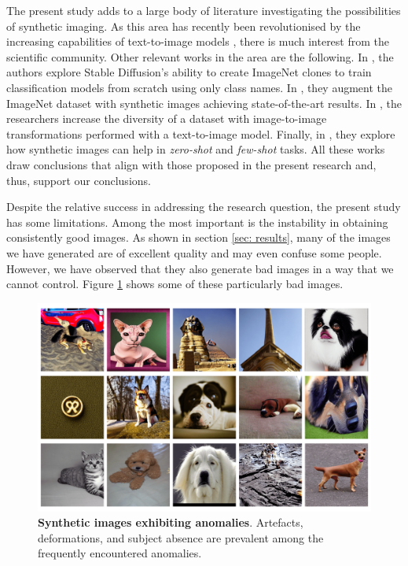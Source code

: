 The present study adds to a large body of literature investigating the possibilities of synthetic imaging. As this area has recently been revolutionised by the increasing capabilities of text-to-image models \cite{ho2020denoising, dhariwal2021diffusion}, there is much interest from the scientific community. Other relevant works in the area are the following. In \cite{sariyildiz2023fake}, the authors explore Stable Diffusion's ability to create ImageNet clones to train classification models from scratch using only class names. In \cite{azizi2023synthetic}, they augment the ImageNet dataset with synthetic images achieving state-of-the-art results. In \cite{trabucco2023effective}, the researchers increase the diversity of a dataset with image-to-image transformations performed with a text-to-image model. Finally, in \cite{he2022synthetic}, they explore how synthetic images can help in \textit{zero-shot} and \textit{few-shot} tasks. All these works draw conclusions that align with those proposed in the present research and, thus, support our conclusions.

Despite the relative success in addressing the research question, the present study has some limitations. Among the most important is the instability in obtaining consistently good images. As shown in section \ref{sec: results}, many of the images we have generated are of excellent quality and may even confuse some people. However, we have observed that they also generate bad images in a way that we cannot control. Figure \ref{fig:low-quality} shows some of these particularly bad images. 

\begin{figure}
    \centering
    \includegraphics[width=1\textwidth]{Pictures/low-quality-img.png} 
    \caption{\textbf{Synthetic images exhibiting anomalies}. Artefacts, deformations, and subject absence are prevalent among the frequently encountered anomalies.}
    \label{fig:low-quality}
\end{figure}

